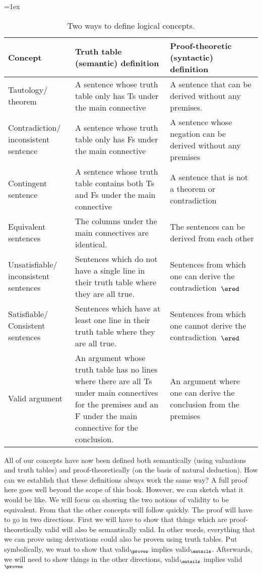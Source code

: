 \begin{sidewaystable}\small
\tabulinesep=1ex
\begin{tabu}{X[.5,c,m] ||X[1,l,m] |X[1,l,m]}
\textbf{Concept} 		&	\textbf{Truth table (semantic) definition} 	&	\textbf{Proof-theoretic (syntactic) definition} \\ \hline \hline

Tautology/ theorem   &	A sentence whose truth table only has Ts under the main connective & A sentence that can be derived without any premises.	 \\ \hline
 
Contradiction/ inconsistent sentence		&	A sentence whose truth table only has Fs under the main connective  &	A sentence whose negation can be derived without any premises\\ \hline

Contingent sentence	&	A sentence whose truth table contains both Ts and Fs under the main connective & A sentence that is not a theorem or contradiction \\ \hline

Equivalent sentences &	The columns under the main connectives are identical.& The sentences can be derived from each other	\\ \hline

Unsatisfiable/ inconsistent sentences	&	Sentences which do not have a single line in their truth table where they are all true.	& Sentences  from which one can derive the contradiction~$\ered$ \\ \hline

Satisfiable/ Consistent sentences	&	Sentences which have at least one line in their truth table where they are all true. & Sentences from which one cannot derive the contradiction~$\ered$	\\ \hline

Valid argument		&	An argument whose truth table has no lines where there are all Ts under main connectives for the premises and an F under the main connective for the conclusion.  & An argument where one can derive the conclusion from the premises	\\ 
\end{tabu}
\caption{Two ways to define logical concepts.}
\label{table:truth_tables_or_derivations}
\end{sidewaystable}

All of our concepts have now been defined both semantically (using
valuations and truth tables) and proof-theoretically (on the basis of
natural deduction). How can we establish that these definitions always
work the same way? A full proof here goes well beyond the scope of
this book. However, we can sketch what it would be like. We will focus
on showing the two notions of validity to be equivalent.  From that
the other concepts will follow quickly. The proof will have to go in
two directions. First we will have to show that things which are
proof-theoretically valid will also be semantically valid. In other words,
everything that we can prove using derivations could also be proven
using truth tables. Put symbolically, we want to show that
valid$_{\proves}$ implies valid$_{\entails}$. Afterwards, we will need
to show things in the other directions,  valid$_{\entails}$ implies
valid$_{\proves}$

